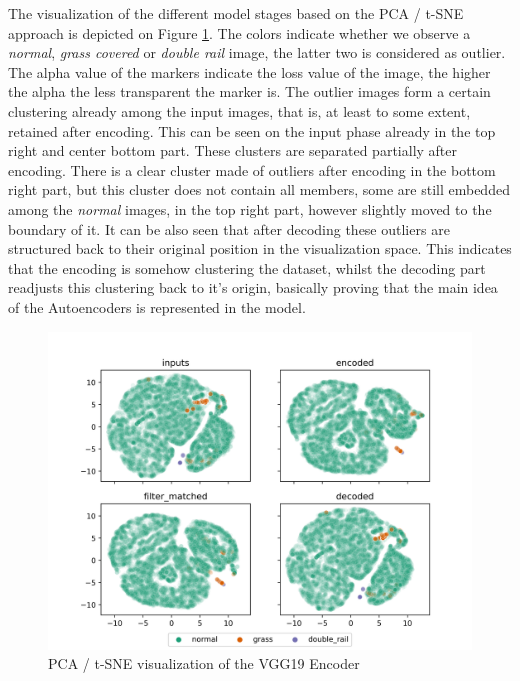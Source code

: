 The visualization of the different model stages based on the PCA / t-SNE approach is depicted on
Figure \ref{fig:vgg19_pca}.
The colors indicate whether we observe a \emph{normal}, \emph{grass covered} or \emph{double rail}
image, the latter two is considered as outlier.
The alpha value of the markers indicate the loss value of the image, the higher the alpha
the less transparent the marker is.
The outlier images form a certain clustering already among the input images, that is, at least to some
extent, retained after encoding.
This can be seen on the input phase already in the top right and center bottom part.
These clusters are separated partially after encoding.
There is a clear cluster made of outliers after encoding in the bottom right part,
but this cluster does not contain all members, some are still embedded among the \emph{normal} images,
in the top right part, however slightly moved to the boundary of it.
It can be also seen that after decoding these outliers are structured back to their original position
in the visualization space.
This indicates that the encoding is somehow clustering the dataset, whilst the decoding part readjusts
this clustering back to it's origin, basically proving that the main idea of the Autoencoders is
represented in the model.

\begin{figure}[!ht]
    \centering
    \includegraphics[width=\textwidth,trim={0 0 0 1cm},clip]{./results/vgg19_vgg19/20230510_172958_feature_vectors_1.png}
    \caption{PCA / t-SNE visualization of the VGG19 Encoder}
    \label{fig:vgg19_pca}
\end{figure}

